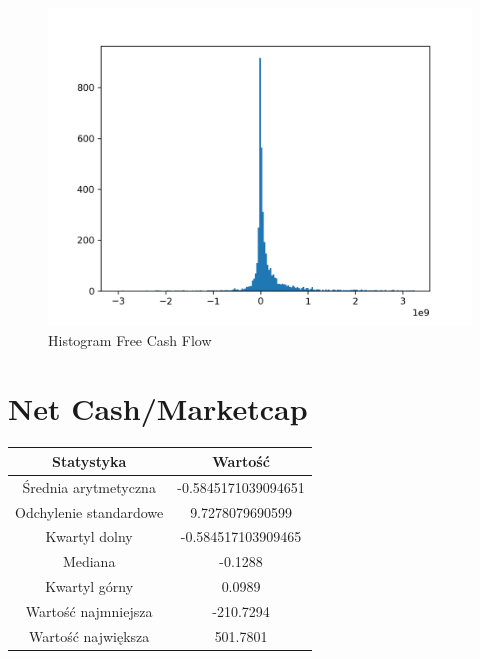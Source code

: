 \documentclass{article}
\begin{document}
\begin{figure}[h!]
    \includegraphics[width=\linewidth]{variables/Free Cash Flow.png}
    \caption{Histogram Free Cash Flow }
\end{figure}\section{ Net Cash/Marketcap }

\begin{center}
    \begin{tabular}{|c | c|} 
    \hline
    Statystyka & Wartość \\
    \hline\hline
    Średnia arytmetyczna & -0.5845171039094651 \\ 
    \hline
    Odchylenie standardowe & 9.7278079690599 \\
    \hline
    Kwartyl dolny & -0.584517103909465 \\
    \hline
    Mediana & -0.1288 \\
    \hline
    Kwartyl górny & 0.0989 \\
    \hline
    Wartość najmniejsza & -210.7294 \\
    \hline
    Wartość największa & 501.7801 \\
    \hline
   \end{tabular}
\end{center}
\end{document}
